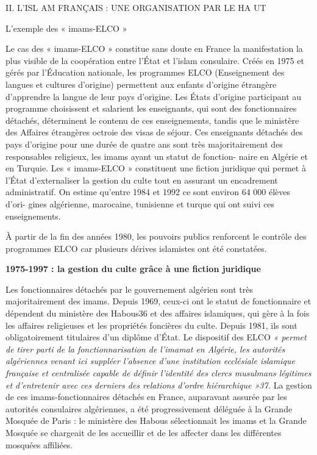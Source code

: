 II. L'ISL AM FRANÇAIS : UNE ORGANISATION PAR LE HA UT


L'exemple des « imams-ELCO »


Le cas des « imams-ELCO » constitue sans doute en France la
manifestation la plus visible de la coopération entre l'État et l'islam
consulaire. Créés en 1975 et gérés par l'Éducation nationale, les
programmes ELCO (Enseignement des langues et cultures d'origine)
permettent aux enfants d'origine étrangère d'apprendre la langue de leur
pays d'origine. Les États d'origine participant au programme choisissent
et salarient les enseignants, qui sont des fonctionnaires détachés,
déterminent le contenu de ces enseignements, tandis que le ministère des
Affaires étrangères octroie des visas de séjour. Ces enseignants
détachés des pays d'origine pour une durée de quatre ans sont très
majoritairement des responsables religieux, les imams ayant un statut de
fonction- naire en Algérie et en Turquie. Les « imams-ELCO » constituent
une fiction juridique qui permet à l'État d'externaliser la gestion du
culte tout en assurant un encadrement administratif. On estime qu'entre
1984 et 1992 ce sont environ 64 000 élèves d'ori- gines algérienne,
marocaine, tunisienne et turque qui ont suivi ces enseignements.

À partir de la fin des années 1980, les pouvoirs publics renforcent le
contrôle des programmes ELCO car plusieurs dérives islamistes ont été
constatées.

\textbf{1975-1997 : la gestion du culte grâce à une fiction juridique}

Les fonctionnaires détachés par le gouvernement algérien sont très
majoritairement des imams. Depuis 1969, ceux-ci ont le statut de
fonctionnaire et dépendent du ministère des Habous36 et des affaires
islamiques, qui gère à la fois les affaires religieuses et les
propriétés foncières du culte. Depuis 1981, ils sont obligatoirement
titulaires d'un diplôme d'État. Le dispositif des ELCO \emph{« permet de
tirer parti de la fonctionnarisation de l'imamat en Algérie, les
autorités algériennes venant ici suppléer l'absence d'une institution
ecclésiale islamique française et centralisée capable de définir
l'identité des clercs musulmans légitimes et d'entretenir avec ces
derniers des relations d'ordre hiérarchique »37.} La gestion de ces
imams-fonctionnaires détachés en France, auparavant assurée par les
autorités consulaires algériennes, a été progressivement déléguée à la
Grande Mosquée de Paris : le ministère des Habous sélectionnait les
imams et la Grande Mosquée se chargeait de les accueillir et de les
affecter dans les différentes mosquées affiliées.

